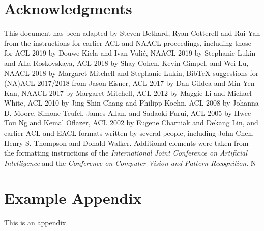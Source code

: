 \documentclass[11pt]{article}
\begin{document}
\section*{Acknowledgments}

This document has been adapted
by Steven Bethard, Ryan Cotterell and Rui Yan
from the instructions for earlier ACL and NAACL proceedings, including those for
ACL 2019 by Douwe Kiela and Ivan Vuli\'{c},
NAACL 2019 by Stephanie Lukin and Alla Roskovskaya,
ACL 2018 by Shay Cohen, Kevin Gimpel, and Wei Lu,
NAACL 2018 by Margaret Mitchell and Stephanie Lukin,
Bib\TeX{} suggestions for (NA)ACL 2017/2018 from Jason Eisner,
ACL 2017 by Dan Gildea and Min-Yen Kan,
NAACL 2017 by Margaret Mitchell,
ACL 2012 by Maggie Li and Michael White,
ACL 2010 by Jing-Shin Chang and Philipp Koehn,
ACL 2008 by Johanna D. Moore, Simone Teufel, James Allan, and Sadaoki Furui,
ACL 2005 by Hwee Tou Ng and Kemal Oflazer,
ACL 2002 by Eugene Charniak and Dekang Lin,
and earlier ACL and EACL formats written by several people, including
John Chen, Henry S. Thompson and Donald Walker.
Additional elements were taken from the formatting instructions of the \emph{International Joint Conference on Artificial Intelligence} and the \emph{Conference on Computer Vision and Pattern Recognition}.
N
%


\appendix

\section{Example Appendix}
\label{sec:appendix}

This is an appendix.
\end{document}
